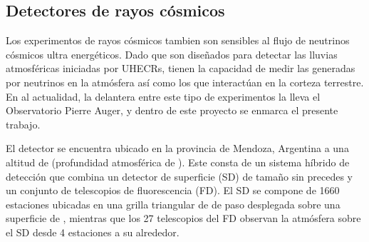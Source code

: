 	\subsection{Detectores de rayos c\'osmicos}
	
	Los experimentos de rayos c\'osmicos tambien son sensibles al flujo de neutrinos c\'osmicos ultra energ\'eticos. 
	Dado que son dise\~nados para detectar las lluvias atmosf\'ericas iniciadas por UHECRs, tienen la capacidad de medir las generadas por neutrinos en la atm\'osfera as\'i como los que interact\'uan en la corteza terrestre.
	En al actualidad, la delantera entre este tipo de experimentos la lleva el Observatorio Pierre Auger, y dentro de este proyecto se enmarca el presente trabajo. 	





	El detector se encuentra ubicado en la provincia de Mendoza, Argentina a una altitud de  (profundidad atmosf\'erica de ).
	Este consta de un sistema h\'ibrido de detecci\'on que combina un detector de superficie (SD) de tama\~no sin precedes y un conjunto de telescopios de fluorescencia (FD).
	El SD se compone de 1660 estaciones \cher{} ubicadas en una grilla triangular de  de paso desplegada sobre una superficie de , mientras que los 27 telescopios del FD observan la atm\'osfera sobre el SD desde 4 estaciones a su alrededor.
	\fi %


